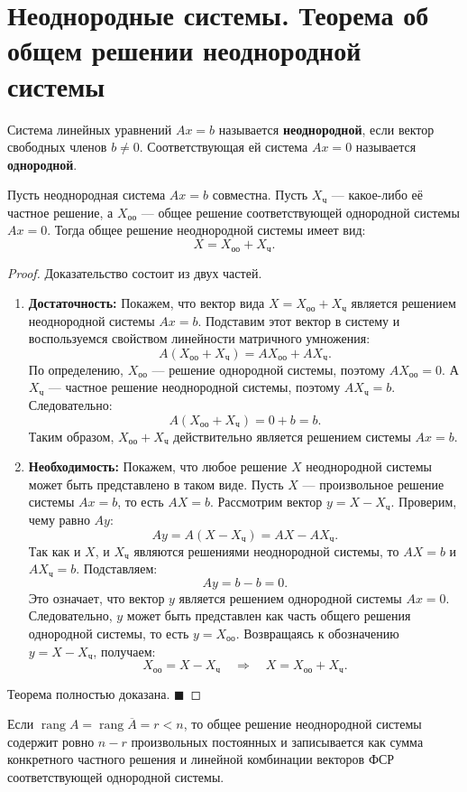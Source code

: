 \section{Неоднородные системы. Теорема об общем решении неоднородной системы}

\begin{definition}
Система линейных уравнений $Ax = b$ называется \textbf{неоднородной}, если вектор свободных членов $b \neq 0$. Соответствующая ей система $Ax = 0$ называется \textbf{однородной}.
\end{definition}

\begin{theorem}
Пусть неоднородная система $Ax = b$ совместна. Пусть $X_{ч}$ --- какое-либо её частное решение, а $X_{оо}$ --- общее решение соответствующей однородной системы $Ax = 0$. Тогда общее решение неоднородной системы имеет вид:
\[
X = X_{оо} + X_{ч}.
\]
\end{theorem}

\begin{proof}
Доказательство состоит из двух частей.

\begin{enumerate}
    \item \textbf{Достаточность:} Покажем, что вектор вида $X = X_{оо} + X_{ч}$ является решением неоднородной системы $Ax = b$.
    Подставим этот вектор в систему и воспользуемся свойством линейности матричного умножения:
    \[
    A(X_{оо} + X_{ч}) = A X_{оо} + A X_{ч}.
    \]
    По определению, $X_{оо}$ --- решение однородной системы, поэтому $A X_{оо} = 0$. А $X_{ч}$ --- частное решение неоднородной системы, поэтому $A X_{ч} = b$. Следовательно:
    \[
    A(X_{оо} + X_{ч}) = 0 + b = b.
    \]
    Таким образом, $X_{оо} + X_{ч}$ действительно является решением системы $Ax = b$.

    \item \textbf{Необходимость:} Покажем, что любое решение $X$ неоднородной системы может быть представлено в таком виде.
    Пусть $X$ --- произвольное решение системы $Ax = b$, то есть $AX = b$. Рассмотрим вектор $y = X - X_{ч}$. Проверим, чему равно $Ay$:
    \[
    Ay = A(X - X_{ч}) = AX - AX_{ч}.
    \]
    Так как и $X$, и $X_{ч}$ являются решениями неоднородной системы, то $AX = b$ и $AX_{ч} = b$. Подставляем:
    \[
    Ay = b - b = 0.
    \]
    Это означает, что вектор $y$ является решением однородной системы $Ax = 0$. Следовательно, $y$ может быть представлен как часть общего решения однородной системы, то есть $y = X_{оо}$. 
    Возвращаясь к обозначению $y = X - X_{ч}$, получаем:
    \[
    X_{оо} = X - X_{ч} \quad \Rightarrow \quad X = X_{оо} + X_{ч}.
    \]
\end{enumerate}
Теорема полностью доказана.
\hfill$\blacksquare$
\end{proof}

\begin{corollary}
Если $\operatorname{rang} A = \operatorname{rang} \overline{A} = r < n$, то общее решение неоднородной системы содержит ровно $n - r$ произвольных постоянных и записывается как сумма конкретного частного решения и линейной комбинации векторов ФСР соответствующей однородной системы.
\end{corollary}
